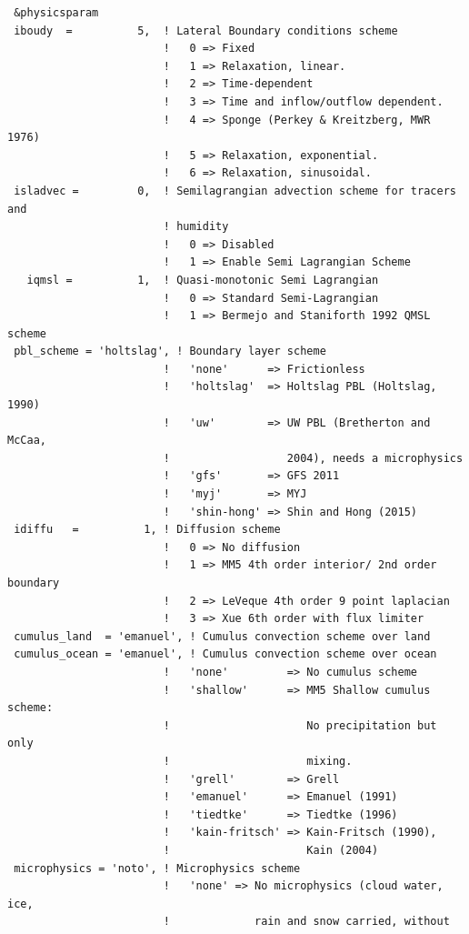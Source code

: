 {\footnotesize
\begin{Verbatim}
 &physicsparam
 iboudy  =          5,  ! Lateral Boundary conditions scheme
                        !   0 => Fixed
                        !   1 => Relaxation, linear.
                        !   2 => Time-dependent
                        !   3 => Time and inflow/outflow dependent.
                        !   4 => Sponge (Perkey & Kreitzberg, MWR 1976)
                        !   5 => Relaxation, exponential.
                        !   6 => Relaxation, sinusoidal.
 isladvec =         0,  ! Semilagrangian advection scheme for tracers and
                        ! humidity
                        !   0 => Disabled
                        !   1 => Enable Semi Lagrangian Scheme
   iqmsl =          1,  ! Quasi-monotonic Semi Lagrangian
                        !   0 => Standard Semi-Lagrangian
                        !   1 => Bermejo and Staniforth 1992 QMSL scheme
 pbl_scheme = 'holtslag', ! Boundary layer scheme
                        !   'none'      => Frictionless
                        !   'holtslag'  => Holtslag PBL (Holtslag, 1990)
                        !   'uw'        => UW PBL (Bretherton and McCaa,
                        !                  2004), needs a microphysics
                        !   'gfs'       => GFS 2011
                        !   'myj'       => MYJ
                        !   'shin-hong' => Shin and Hong (2015)
 idiffu   =          1, ! Diffusion scheme
                        !   0 => No diffusion
                        !   1 => MM5 4th order interior/ 2nd order boundary
                        !   2 => LeVeque 4th order 9 point laplacian 
                        !   3 => Xue 6th order with flux limiter
 cumulus_land  = 'emanuel', ! Cumulus convection scheme over land
 cumulus_ocean = 'emanuel', ! Cumulus convection scheme over ocean
                        !   'none'         => No cumulus scheme
                        !   'shallow'      => MM5 Shallow cumulus scheme:
                        !                     No precipitation but only
                        !                     mixing.
                        !   'grell'        => Grell
                        !   'emanuel'      => Emanuel (1991)
                        !   'tiedtke'      => Tiedtke (1996)
                        !   'kain-fritsch' => Kain-Fritsch (1990),
                        !                     Kain (2004)
 microphysics = 'noto', ! Microphysics scheme
                        !   'none' => No microphysics (cloud water, ice,
                        !             rain and snow carried, without

\end{Verbatim}}
